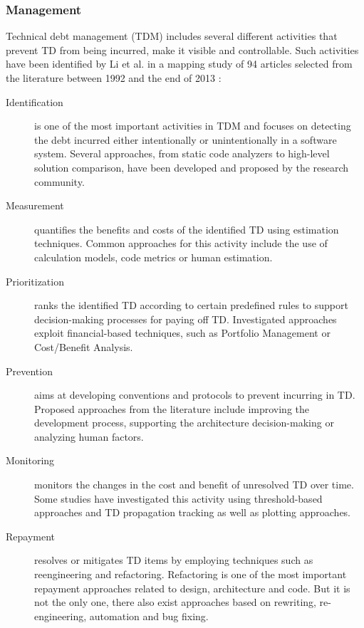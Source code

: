 \subsubsection{Management}
Technical debt management (TDM) includes several different activities that prevent TD from being incurred, make it visible and controllable. Such activities have been identified by Li et al. in a mapping study of 94 articles selected from the literature between 1992 and the end of 2013 \cite{li_systematic_2015}:
\begin{description} %
    \item[Identification] is one of the most important activities in TDM and focuses on detecting the debt incurred either intentionally or unintentionally in a software system.
    Several approaches, from static code analyzers to high-level solution comparison, have been developed and proposed by the research community.

    \item[Measurement] quantifies the benefits and costs of the identified TD using estimation techniques. Common approaches for this activity include the use of calculation models, code metrics or human estimation.

    \item[Prioritization] ranks the identified TD according to certain predefined rules to support decision-making processes for paying off TD. Investigated approaches exploit financial-based techniques, such as Portfolio Management or Cost/Benefit Analysis.

    \item[Prevention] aims at developing conventions and protocols to prevent incurring in TD. Proposed approaches from the literature include improving the development process, supporting the architecture decision-making or analyzing human factors.

    \item[Monitoring] monitors the changes in the cost and benefit of unresolved TD over time. Some studies have investigated this activity using threshold-based approaches and TD propagation tracking as well as plotting approaches.

    \item[Repayment] resolves or mitigates TD items by employing techniques such as reengineering and refactoring. Refactoring is one of the most important repayment approaches related to design, architecture and code. But it is not the only one, there also exist approaches based on rewriting, re-engineering, automation and bug fixing.


\end{description}
